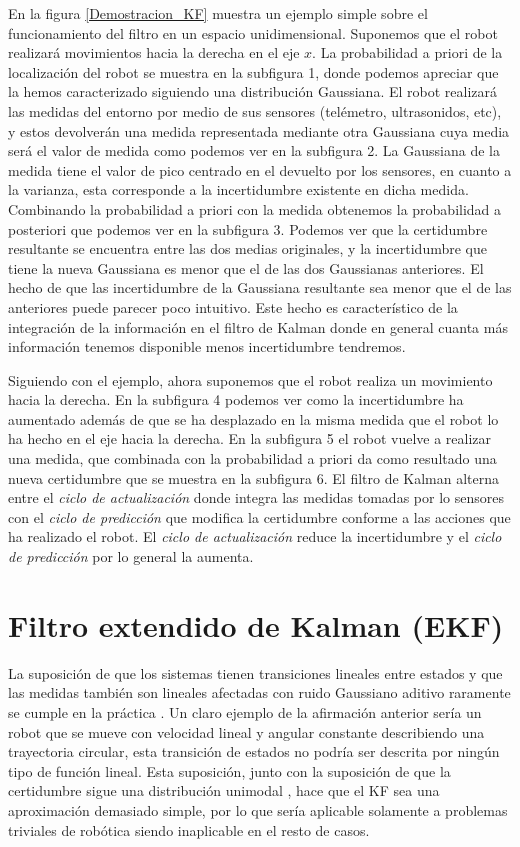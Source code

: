En la figura \ref{Demostracion_KF} muestra un ejemplo simple sobre el funcionamiento del filtro en un espacio unidimensional.
Suponemos que el robot realizará movimientos hacia la derecha en el eje $x$.
La probabilidad a priori de la localización del robot se muestra en la subfigura 1, donde podemos apreciar que la hemos caracterizado siguiendo una distribución Gaussiana.
El robot realizará las medidas del entorno por medio de sus sensores (telémetro, ultrasonidos, etc), y estos devolverán una medida representada mediante otra Gaussiana cuya media será el valor de medida como podemos ver en la subfigura 2.
La Gaussiana de la medida tiene el valor de pico centrado en el devuelto por los sensores, en cuanto a la varianza, esta corresponde a la incertidumbre existente en dicha medida.
Combinando la probabilidad a priori con la medida obtenemos la probabilidad a posteriori que podemos ver en la subfigura 3.
Podemos ver que la certidumbre resultante se encuentra entre las dos medias originales, y la incertidumbre que tiene la nueva Gaussiana es menor que el de las dos Gaussianas anteriores.
El hecho de que las incertidumbre de la Gaussiana resultante sea menor que el de las anteriores puede parecer poco intuitivo.
Este hecho es característico de la integración de la información en el filtro de Kalman donde en general cuanta más información tenemos disponible menos incertidumbre tendremos.

Siguiendo con el ejemplo, ahora suponemos que el robot realiza un movimiento hacia la derecha.
En la subfigura 4 podemos ver como la incertidumbre ha aumentado además de que se ha desplazado en la misma medida que el robot lo ha hecho en el eje hacia la derecha.
En la subfigura 5 el robot vuelve a realizar una medida, que combinada con la probabilidad a priori da como resultado una nueva certidumbre que se muestra en la subfigura 6.
El filtro de Kalman alterna entre el \textit{ciclo de actualización} donde integra las medidas tomadas por lo sensores con el \textit{ciclo de predicción} que modifica la certidumbre conforme a las acciones que ha realizado el robot.
El \textit{ciclo de actualización} reduce la incertidumbre y el \textit{ciclo de predicción} por lo general la aumenta.

\section{Filtro extendido de Kalman (EKF)}
La suposición de que los sistemas tienen transiciones lineales entre estados y que las medidas también son lineales afectadas con ruido Gaussiano aditivo raramente se cumple en la práctica \cite{thrun_probabilistic_2005}.
Un claro ejemplo de la afirmación anterior sería un robot que se mueve con velocidad lineal y angular constante describiendo una trayectoria circular, esta transición de estados no podría ser descrita por ningún tipo de función lineal.
Esta suposición, junto con la suposición de que la certidumbre sigue una distribución unimodal , hace que el KF sea una aproximación demasiado simple, por lo que sería aplicable solamente a problemas triviales de robótica siendo inaplicable en el resto de casos.

